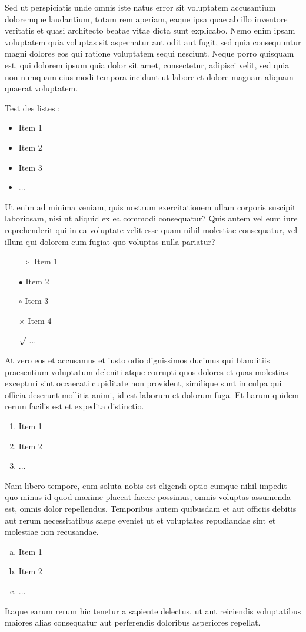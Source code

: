 Sed ut perspiciatis unde omnis iste natus error sit voluptatem accusantium doloremque laudantium, totam rem aperiam, eaque ipsa quae ab illo inventore veritatis et quasi architecto beatae vitae dicta sunt explicabo. Nemo enim ipsam voluptatem quia voluptas sit aspernatur aut odit aut fugit, sed quia consequuntur magni dolores eos qui ratione voluptatem sequi nesciunt. Neque porro quisquam est, qui dolorem ipsum quia dolor sit amet, consectetur, adipisci velit, sed quia non numquam eius modi tempora incidunt ut labore et dolore magnam aliquam quaerat voluptatem. 

Test des listes : 

\begin{itemize}
	\item Item 1
	\item Item 2
	\item Item 3
	\item ...
\end{itemize}


Ut enim ad minima veniam, quis nostrum exercitationem ullam corporis suscipit laboriosam, nisi ut aliquid ex ea commodi consequatur? Quis autem vel eum iure reprehenderit qui in ea voluptate velit esse quam nihil molestiae consequatur, vel illum qui dolorem eum fugiat quo voluptas nulla pariatur?

\begin{itemize}
	\item[$\Rightarrow$] Item 1
	\item[$\bullet$] Item 2
	\item[$\circ$] Item 3
	\item[$\times$] Item 4
	\item[$\surd$] ...
\end{itemize}

At vero eos et accusamus et iusto odio dignissimos ducimus qui blanditiis praesentium voluptatum deleniti atque corrupti quos dolores et quas molestias excepturi sint occaecati cupiditate non provident, similique sunt in culpa qui officia deserunt mollitia animi, id est laborum et dolorum fuga. Et harum quidem rerum facilis est et expedita distinctio. 

\begin{enumerate}
	\item Item 1
	\item Item 2
	\item ...
\end{enumerate}

Nam libero tempore, cum soluta nobis est eligendi optio cumque nihil impedit quo minus id quod maxime placeat facere possimus, omnis voluptas assumenda est, omnis dolor repellendus. Temporibus autem quibusdam et aut officiis debitis aut rerum necessitatibus saepe eveniet ut et voluptates repudiandae sint et molestiae non recusandae. 

\begin{enumerate}[a)]
	\item Item 1
	\item Item 2
	\item ...
\end{enumerate}

Itaque earum rerum hic tenetur a sapiente delectus, ut aut reiciendis voluptatibus maiores alias consequatur aut perferendis doloribus asperiores repellat.

